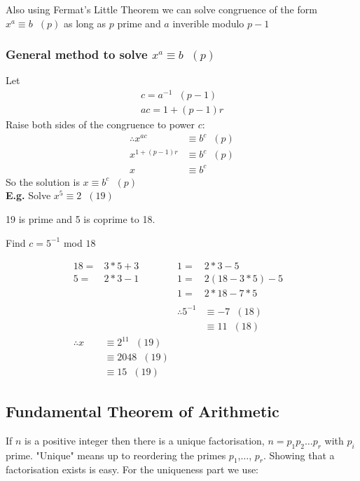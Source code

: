 \documentclass[11pt]{article}
\begin{document}
Also using Fermat's Little Theorem we can solve congruence of the form $x^a \equiv b\hspace{7pt} (p) $ as long as $p$ prime and $a$ inverible modulo $p-1$

\subsubsection{General method to solve $x^a \equiv b\hspace{7pt} (p)$}


Let
\begin{align*} 
c = a^{-1}\hspace{7pt} (p-1)\\
	ac = 1+ (p-1)r
\end{align*}
Raise both sides of the congruence to power $c$:
\begin{align*}
	\therefore x^{ac}  &\equiv b^{c}\hspace{7pt} (p)\\
	 x^{1+(p-1)r} &\equiv b^{c}\hspace{7pt}(p)\\
	 x &\equiv b^{c}
\end{align*}
So the solution is $x \equiv b^c\hspace{7pt} (p)$\\
\textbf{E.g.} Solve $x^5 \equiv 2\hspace{7pt} (19) $

19 is prime and 5 is coprime to 18.

Find $c = 5^{-1} $ mod $ 18$

\begin{align*}
	18 =& 3*5 +3& 1=& 2*3 - 5&\\
	5 =& 2*3 - 1 & 1=&2(18-3*5) - 5&\\
	& & 1=&2*18 - 7*5&\\
	\\
	&&\therefore 5^{-1} &\equiv -7\hspace{7pt} (18)\\
	&&&\equiv 11\hspace{7pt} (18)\\ 
	\therefore x &\equiv 2^{11}\hspace{7pt} (19)\\
	& \equiv 2048 \hspace{7pt}(19)\\
	& \equiv 15\hspace{7pt} (19)
\end{align*}

\subsection{Fundamental Theorem of Arithmetic}
If $n$ is a positive integer then there is a unique factorisation, $n= p_1p_2\dots p_r$ with $p_i$ prime. "Unique" means up to reordering the primes $p_1$,$\dots$, $p_r$.
Showing that a factorisation exists is easy. For the uniqueness part we use:
\end{document}
